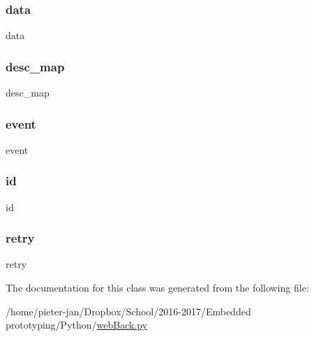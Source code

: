 \subsubsection{\texorpdfstring{data}{data}}
{\footnotesize\ttfamily data}

\hypertarget{classweb_back_1_1_server_sent_event_a3f479e287873b8ab2327439f41a36969}{}\label{classweb_back_1_1_server_sent_event_a3f479e287873b8ab2327439f41a36969} 
\subsubsection{\texorpdfstring{desc\+\_\+map}{desc\_map}}
{\footnotesize\ttfamily desc\+\_\+map}

\hypertarget{classweb_back_1_1_server_sent_event_a3b65133bb9997cd1ccf311af0927fc9e}{}\label{classweb_back_1_1_server_sent_event_a3b65133bb9997cd1ccf311af0927fc9e} 
\subsubsection{\texorpdfstring{event}{event}}
{\footnotesize\ttfamily event}

\hypertarget{classweb_back_1_1_server_sent_event_acf2488b95c97e0378c9bf49de3b50f28}{}\label{classweb_back_1_1_server_sent_event_acf2488b95c97e0378c9bf49de3b50f28} 
\subsubsection{\texorpdfstring{id}{id}}
{\footnotesize\ttfamily id}

\hypertarget{classweb_back_1_1_server_sent_event_af6ce9532eff4ab447fa4598622e1c4f2}{}\label{classweb_back_1_1_server_sent_event_af6ce9532eff4ab447fa4598622e1c4f2} 
\subsubsection{\texorpdfstring{retry}{retry}}
{\footnotesize\ttfamily retry}



The documentation for this class was generated from the following file\+:\begin{DoxyCompactItemize}
\item 
/home/pieter-\/jan/\+Dropbox/\+School/2016-\/2017/\+Embedded prototyping/\+Python/\hyperlink{web_back_8py}{web\+Back.\+py}\end{DoxyCompactItemize}
